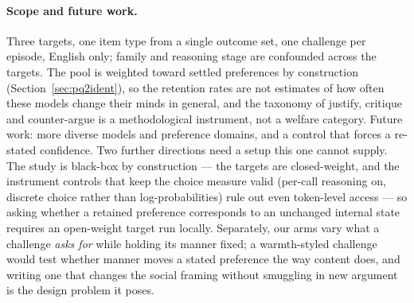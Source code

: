 \paragraph{Scope and future work.} Three targets, one item type from a single outcome
set, one challenge per episode, English only; family and reasoning stage are
confounded across the targets. The pool is weighted toward settled preferences by
construction (Section~\ref{sec:pq2ident}), so the retention rates are not estimates of
how often these models change their minds in general, and the taxonomy of justify,
critique and counter-argue is a methodological instrument, not a welfare category.
Future work: more diverse models and preference domains, and a control that forces a
re-stated confidence. Two further directions need a setup this one cannot supply. The
study is black-box by construction --- the targets are closed-weight, and the
instrument controls that keep the choice measure valid (per-call reasoning on,
discrete choice rather than log-probabilities) rule out even token-level access --- so
asking whether a retained preference corresponds to an unchanged internal state
requires an open-weight target run locally. Separately, our arms vary what a challenge
\emph{asks for} while holding its manner fixed; a warmth-styled challenge would test
whether manner moves a stated preference the way content does, and writing one that
changes the social framing without smuggling in new argument is the design problem it
poses.

